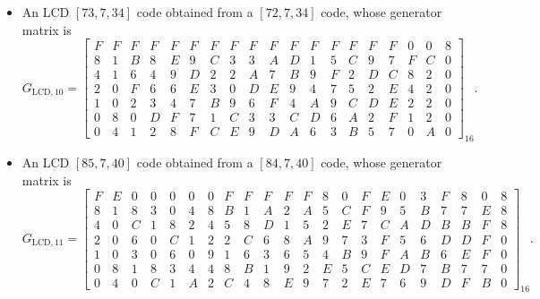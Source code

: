\documentclass{article}
\theoremstyle{definition}
\theoremstyle{remark}
\begin{document}
\begin{itemize}
\item An LCD $[73,7,34]$ code obtained from a $[72,7,34]$ code, whose generator matrix is
{\tiny
\[
G_{\mathrm{LCD, 10}}=\left[
\begin{array}{ccccccccccccccccccc}
F & F & F & F & F & F & F & F & F & F & F & F & F & F & F & F & 0 & 0 & 8 \\
8 & 1 & B & 8 & E & 9 & C & 3 & 3 & A & D & 1 & 5 & C & 9 & 7 & F & C & 0 \\
4 & 1 & 6 & 4 & 9 & D & 2 & 2 & A & 7 & B & 9 & F & 2 & D & C & 8 & 2 & 0 \\
2 & 0 & F & 6 & 6 & E & 3 & 0 & D & E & 9 & 4 & 7 & 5 & 2 & E & 4 & 2 & 0 \\
1 & 0 & 2 & 3 & 4 & 7 & B & 9 & 6 & F & 4 & A & 9 & C & D & E & 2 & 2 & 0 \\
0 & 8 & 0 & D & F & 7 & 1 & C & 3 & 3 & C & D & 6 & A & 2 & F & 1 & 2 & 0 \\
0 & 4 & 1 & 2 & 8 & F & C & E & 9 & D & A & 6 & 3 & B & 5 & 7 & 0 & A & 0
\end{array}
\right]_{16}.
\]
}

\item An LCD $[85,7,40]$ code obtained from a $[84,7,40]$ code, whose generator matrix is
{\tiny
\[
G_{\mathrm{LCD, 11}}=\left[
\begin{array}{cccccccccccccccccccccc}
F & E & 0 & 0 & 0 & 0 & 0 & F & F & F & F & F & 8 & 0 & F & E & 0 & 3 & F & 8 & 0 & 8 \\
8 & 1 & 8 & 3 & 0 & 4 & 8 & B & 1 & A & 2 & A & 5 & C & F & 9 & 5 & B & 7 & 7 & E & 8 \\
4 & 0 & C & 1 & 8 & 2 & 4 & 5 & 8 & D & 1 & 5 & 2 & E & 7 & C & A & D & B & B & F & 8 \\
2 & 0 & 6 & 0 & C & 1 & 2 & 2 & C & 6 & 8 & A & 9 & 7 & 3 & F & 5 & 6 & D & D & F & 0 \\
1 & 0 & 3 & 0 & 6 & 0 & 9 & 1 & 6 & 3 & 6 & 5 & 4 & B & 9 & F & A & B & 6 & E & F & 0 \\
0 & 8 & 1 & 8 & 3 & 4 & 4 & 8 & B & 1 & 9 & 2 & E & 5 & C & E & D & 7 & B & 7 & 7 & 0 \\
0 & 4 & 0 & C & 1 & A & 2 & C & 4 & 8 & E & 9 & 7 & 2 & E & 7 & 6 & 9 & D & F & B & 0
\end{array}
\right]_{16}.
\]
}


\end{itemize}
\end{document}

